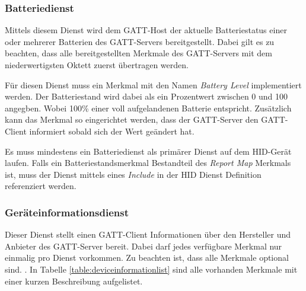 \subsubsection{Batteriedienst}
Mittels diesem Dienst wird dem \acs{GATT}-Host der aktuelle Batteriestatus einer oder mehrerer Batterien des \acs{GATT}-Servers bereitgestellt. Dabei gilt es zu beachten, dass alle bereitgestellten Merkmale des \acs{GATT}-Servers mit dem niederwertigsten Oktett zuerst übertragen werden. \cite[S.~6]{bluetoothBatteryS}

Für diesen Dienst muss ein Merkmal mit den Namen \textit{Battery Level} implementiert werden. Der Batteriestand wird dabei als ein Prozentwert zwischen 0 und 100 angegben. Wobei 100\% einer voll aufgelandenen Batterie entspricht. Zusätzlich kann das Merkmal so eingerichtet werden, dass der \acs{GATT}-Server den \acs{GATT}-Client informiert sobald sich der Wert geändert hat. \cite[S.~8]{bluetoothBatteryS}

Es muss mindestens ein Batteriedienst als primärer Dienst auf dem \acs{HID}-Gerät laufen. Falls ein Batteriestandsmerkmal Bestandteil des \textit{Report Map} Merkmals ist, muss der Dienst mittels eines \textit{Include} in der \acs{HID} Dienst Definition referenziert werden. \cite[S.~14]{bluetoothHOGP}

\subsubsection{Geräteinformationsdienst}
Dieser Dienst stellt einen \acs{GATT}-Client Informationen über den Hersteller und Anbieter des \acs{GATT}-Server bereit. Dabei darf jedes verfügbare Merkmal nur einmalig pro Dienst vorkommen. Zu beachten ist, dass alle Merkmale optional sind. \cite[S.~6ff.]{bluetoothDeviceI}. In Tabelle \ref{table:deviceinformationlist} sind alle vorhanden Merkmale mit einer kurzen Beschreibung aufgelistet.

